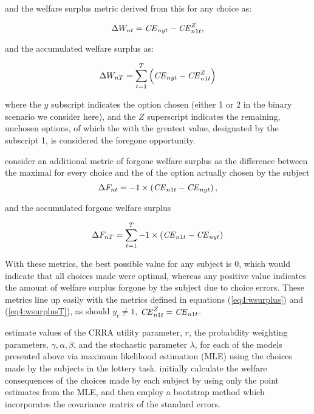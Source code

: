 \documentclass[../main.tex]{subfiles}
\begin{document}
\noindent and the welfare surplus metric derived from this {\CE} for any choice as:

\begin{equation}
	\label{eq4:wsurplus}
	\Delta W_{nt} =  {\mathit{CE}}_{nyt} - {\mathit{CE}}_{n1t}^Z ,
\end{equation}

\noindent and the accumulated welfare surplus as:

\begin{equation}
	\label{eq4:wsurplusT}
	\Delta W_{nT} = \sum_{t=1}^T \left( {\mathit{CE}}_{nyt} - {\mathit{CE}}_{n1t}^Z \right)
\end{equation}

\noindent where the $y$ subscript indicates the option chosen (either 1 or 2 in the binary scenario we consider here), and the $Z$ superscript indicates the remaining, unchosen options, of which the {\CE} with the greatest value, designated by the subscript 1, is considered the foregone opportunity.

\textcite[106]{Harrison2016} consider an additional metric of forgone welfare surplus as the difference between the maximal {\CE} for every choice and the {\CE} of the option actually chosen by the subject
\begin{equation}
	\label{eq4:wforgone}
	\Delta F_{nt} = -1 \times \left( {\mathit{CE}}_{n1t} - {\mathit{CE}}_{nyt} \right) , 
\end{equation}

\noindent and the accumulated forgone welfare surplus

\begin{equation}
	\label{eq4:wforgoneT}
	\Delta F_{nT} = \sum_{t=1}^T  -1 \times \left( {\mathit{CE}}_{n1t} - {\mathit{CE}}_{nyt} \right)
\end{equation}

\noindent With these metrics, the best possible value for any subject is 0, which would indicate that all choices made were optimal, whereas any positive value indicates the amount of welfare surplus forgone by the subject due to choice errors.
These metrics line up easily with the metrics defined in equations (\ref{eq4:wsurplus}) and (\ref{eq4:wsurplusT}), as should $y_t \neq 1$, ${\mathit{CE}}_{n1t}^Z = {\mathit{CE}}_{n1t}$.

\textcite{Harrison2016} estimate values of the CRRA utility parameter, $r$, the probability weighting parameters, $\gamma, \alpha, \beta$, and the stochastic parameter $\lambda$, for each of the models presented above via maximum likelihood estimation (MLE) using the choices made by the subjects in the lottery task.
\textcite[107,110]{Harrison2016} initially calculate the welfare consequences of the choices made by each subject by using only the point estimates from the MLE, and then employ a bootstrap method which incorporates the covariance matrix of the standard errors.
\end{document}
